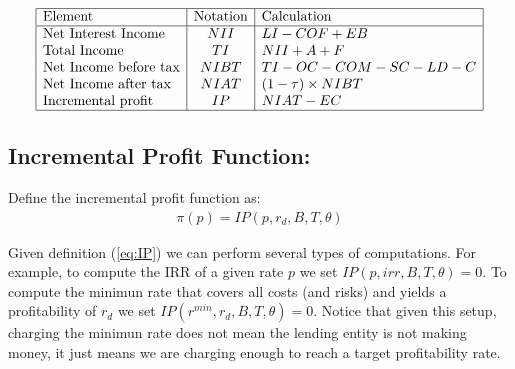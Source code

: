 \renewcommand{\arraystretch}{1.5} %
\begin{center} %
\[ %
\begin{array}{|l|c|l|} \hline %
\mbox{Element} & \mbox{Notation} & \mbox{Calculation}\\ \hline
\mbox{Net Interest Income }  & NII & LI-COF+EB\\
\mbox{Total Income  }  & TI & NII+A+F\\
\mbox{Net Income before tax}  & NIBT & TI-OC-COM-SC-LD-C\\
\mbox{Net Income after tax }  & NIAT&(1-\tau)\times NIBT \\
\mbox{Incremental profit  }  & IP & NIAT-EC\\

\hline
\end{array} %
\] %
\end{center}

\subsection{ Incremental Profit Function: }
Define the incremental profit function as:
\begin{align}
\pi(p)=IP(p,r_d,B,T,\theta) \label{eq:IP}
\end{align}

Given definition (\ref{eq:IP}) we can perform several types of computations. For example, to compute the IRR of a given rate $p$ we set $IP(p,irr,B,T,\theta)=0$. To compute the minimun rate that covers all costs (and risks) and yields a profitability of $r_d$ we set $IP(r^{min},r_d,B,T,\theta)=0$. Notice that given this setup, charging the minimun rate does not mean the lending entity is not making money, it just means we are charging enough to reach a target profitability rate.
